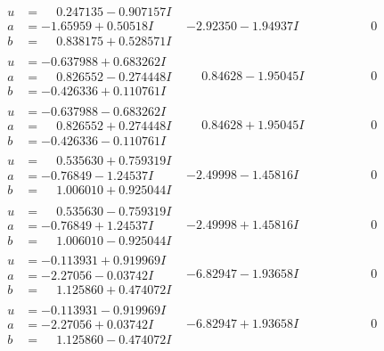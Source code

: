 \documentclass[1p]{elsarticle_modified}
\theoremstyle{definition}
\begin{document}
$$\begin{array}{c|c|c}
\begin{aligned}
u &= \phantom{-}0.247135 - 0.907157 I \\
a &= -1.65959 + 0.50518 I \\
b &= \phantom{-}0.838175 + 0.528571 I\end{aligned}
 & -2.92350 - 1.94937 I & \phantom{-0.000000 } 0 \\ \hline\begin{aligned}
u &= -0.637988 + 0.683262 I \\
a &= \phantom{-}0.826552 - 0.274448 I \\
b &= -0.426336 + 0.110761 I\end{aligned}
 & \phantom{-}0.84628 - 1.95045 I & \phantom{-0.000000 } 0 \\ \hline\begin{aligned}
u &= -0.637988 - 0.683262 I \\
a &= \phantom{-}0.826552 + 0.274448 I \\
b &= -0.426336 - 0.110761 I\end{aligned}
 & \phantom{-}0.84628 + 1.95045 I & \phantom{-0.000000 } 0 \\ \hline\begin{aligned}
u &= \phantom{-}0.535630 + 0.759319 I \\
a &= -0.76849 - 1.24537 I \\
b &= \phantom{-}1.006010 + 0.925044 I\end{aligned}
 & -2.49998 - 1.45816 I & \phantom{-0.000000 } 0 \\ \hline\begin{aligned}
u &= \phantom{-}0.535630 - 0.759319 I \\
a &= -0.76849 + 1.24537 I \\
b &= \phantom{-}1.006010 - 0.925044 I\end{aligned}
 & -2.49998 + 1.45816 I & \phantom{-0.000000 } 0 \\ \hline\begin{aligned}
u &= -0.113931 + 0.919969 I \\
a &= -2.27056 - 0.03742 I \\
b &= \phantom{-}1.125860 + 0.474072 I\end{aligned}
 & -6.82947 - 1.93658 I & \phantom{-0.000000 } 0 \\ \hline\begin{aligned}
u &= -0.113931 - 0.919969 I \\
a &= -2.27056 + 0.03742 I \\
b &= \phantom{-}1.125860 - 0.474072 I\end{aligned}
 & -6.82947 + 1.93658 I & \phantom{-0.000000 } 0 \\ \hline\begin{aligned}

\end{aligned}
\end{array}$$
\end{document}
